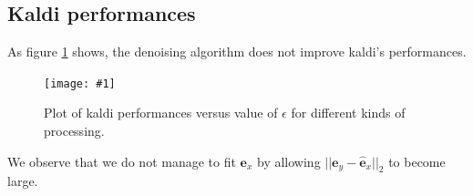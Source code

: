 \documentclass[a4paper]{report}
\newcommand{\img}[3]{\begin{figure}[!h] \centering \texttt{[image: \#1]}\captionsetup{justification=centering} \caption{#3} \label{#1} \end{figure}}
\newcommand{\ey}{\textbf{e}_y}
\newcommand{\ex}{\textbf{e}_x}
\newcommand{\exhat}{ \hat{\textbf{e}}_x }
\begin{document}
\subsection{Kaldi performances}


As figure \ref{kaldiperformances} shows, the denoising algorithm does not improve kaldi's performances.
\img{kaldiperformances}{.5}{Plot of kaldi performances versus value of $\epsilon$ for different kinds of processing.}

We observe that we do not manage to fit $\ex$ by allowing $||\ey-\exhat||_2$ to become large.



\end{document}
